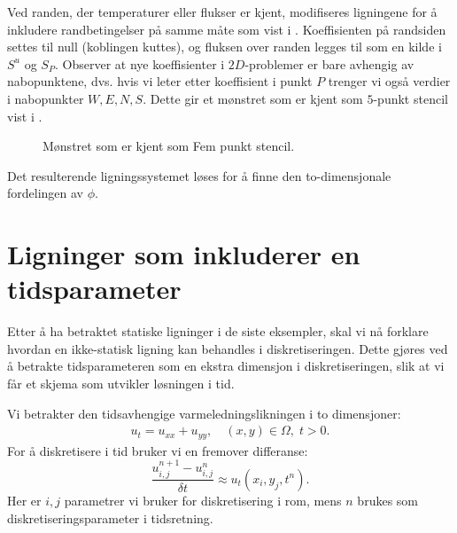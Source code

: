 Ved randen, der temperaturer eller flukser er kjent, modifiseres ligningene for å inkludere randbetingelser på samme måte som vist i . Koeffisienten på randsiden settes til null (koblingen kuttes), og fluksen over randen legges til som en kilde i $S^u$ og $S_P$. Observer at nye koeffisienter i $2D$-problemer er bare avhengig av nabopunktene, dvs. hvis vi leter etter koeffisient i punkt $P$ trenger vi også verdier i nabopunkter $W,E,N,S$. Dette gir et mønstret som er kjent som $5$-punkt stencil vist i .
\begin{figure}[ht!]\centering 
{}\caption{Mønstret som er kjent som Fem punkt stencil.}\label{5pt_stencil}
\end{figure}

Det resulterende ligningssystemet løses for å finne den to-dimensjonale fordelingen av $\phi$. 

\section{Ligninger som inkluderer en tidsparameter}

Etter å ha betraktet statiske ligninger i de siste eksempler, skal vi nå forklare hvordan en ikke-statisk ligning kan behandles i diskretiseringen. Dette gjøres ved å betrakte tidsparameteren som en ekstra dimensjon i diskretiseringen, slik at vi får et skjema som utvikler løsningen i tid.

Vi betrakter den tidsavhengige varmeledningslikningen i to dimensjoner:
\begin{align}\label{eq:varme_tid}
u_t = u_{xx} + u_{yy}, \quad (x,y) \in \Omega, \; t > 0.
\end{align}
For å diskretisere i tid bruker vi en fremover differanse:
\[
\frac{u^{n+1}_{i,j} - u^n_{i,j}}{\delta t} \approx u_t(x_i,y_j,t^n).
\]
Her er $i,j$ parametrer vi bruker for diskretisering i rom, mens $n$ brukes som diskretiseringsparameter i tidsretning.

